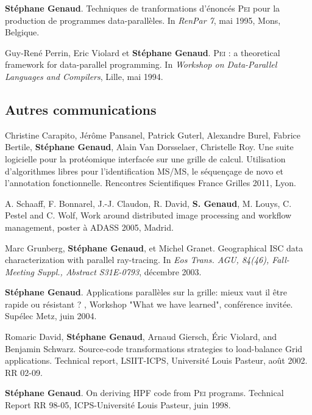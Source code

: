 \documentclass[11pt]{article}
\begin{document}
\begin{thebibliography}{99}
\textbf{Stéphane Genaud}.
\newblock Techniques de tranformations d'énoncés \textsc{Pei} pour la
  production de programmes data-parallèles.
\newblock In {\em RenPar 7}, mai 1995, Mons, Belgique.

Guy-René Perrin, Eric Violard et \textbf{Stéphane Genaud}.
\newblock \textsc{Pei} : a theoretical framework for data-parallel programming.
\newblock In {\em Workshop on Data-Parallel Languages and Compilers}, Lille, mai 1994.
\vspace{3mm}


\subsection*{Autres communications}

Christine Carapito, Jérôme Pansanel, Patrick Guterl, Alexandre Burel, Fabrice 
Bertile, \textbf{Stéphane Genaud}, Alain Van Dorsselaer, Christelle Roy.
\newblock Une suite logicielle pour la protéomique interfacée sur une grille de 
calcul. Utilisation d'algorithmes libres pour l'identification MS/MS, le 
séquençage de novo et l'annotation fonctionnelle.
\newblock Rencontres Scientifiques France Grilles 2011, Lyon.

A. Schaaff, F. Bonnarel, J.-J. Claudon, R. David, \textbf{S. Genaud}, M. Louys, C. Pestel and C. Wolf, 
\newblock Work around distributed image processing and workflow management, 
\newblock poster à ADASS 2005, Madrid.


Marc Grunberg, \textbf{Stéphane Genaud}, et Michel Granet.
\newblock Geographical {ISC} data characterization with parallel ray-tracing.
\newblock In {\em Eos Trans. AGU, 84(46), Fall-Meeting Suppl., Abstract
  S31E-0793}, décembre 2003.

\textbf{Stéphane Genaud}.
\newblock Applications parallèles sur la grille: mieux vaut il être rapide ou résistant ? 
, Workshop "What we have learned", conférence invitée.
\newblock Supélec Metz, juin 2004. 

Romaric David, \textbf{Stéphane Genaud}, Arnaud Giersch, \'{E}ric Violard, and
  Benjamin Schwarz.
\newblock Source-code transformations strategies to load-balance {G}rid
  applications.
\newblock Technical report, LSIIT-ICPS, Université Louis Pasteur, août
  2002.
\newblock RR 02-09.


\textbf{Stéphane Genaud}.
\newblock On deriving {HPF} code from \textsc{Pei} programs.
\newblock Technical Report RR 98-05, ICPS-Université Louis Pasteur, juin
  1998.


\end{thebibliography}
\end{document}
